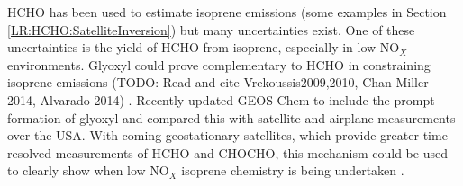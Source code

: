     HCHO has been used to estimate isoprene emissions (some examples in Section \ref{LR:HCHO:SatelliteInversion}) but many uncertainties exist.
    One of these uncertainties is the yield of HCHO from isoprene, especially in low NO$_X$ environments.
    Glyoxyl could prove complementary to HCHO in constraining isoprene emissions (TODO: Read and cite Vrekoussis2009,2010, Chan Miller 2014, Alvarado 2014) \citep{Miller2017}.
    Recently \cite{Miller2017} updated GEOS-Chem to include the prompt formation of glyoxyl and compared this with satellite and airplane measurements over the USA.
    With coming geostationary satellites, which provide greater time resolved measurements of HCHO and CHOCHO, this mechanism could be used to clearly show when low NO$_X$ isoprene chemistry is being undertaken \citep{Miller2017}.